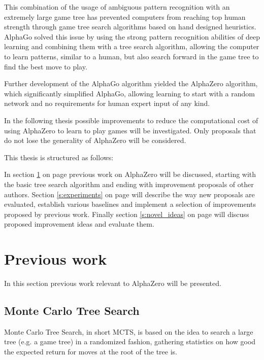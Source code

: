 \documentclass[12pt,onecolumn,oneside,titlepage]{article}
\begin{document}
This combination of the usage of ambiguous pattern recognition with an extremely large game tree has prevented computers from reaching top human strength through game tree search algorithms based on hand designed heuristics.
AlphaGo solved this issue by using the strong pattern recognition abilities of deep learning and combining them with a tree search algorithm, allowing the computer to learn patterns, similar to a human, but also search forward in the game tree to find the best move to play.

Further development of the AlphaGo algorithm yielded the AlphaZero algorithm, which significantly simplified AlphaGo, allowing learning to start with a random network and no requirements for human expert input of any kind.

In the following thesis possible improvements to reduce the computational cost of using AlphaZero to learn to play games will be investigated. Only proposals that do not lose the generality of AlphaZero will be considered.

This thesis is structured as follows:

In section \ref{sec:prev_work} on page \pageref{sec:prev_work} previous work on AlphaZero will be discussed, starting with the basic tree search algorithm and ending with improvement proposals of other authors.
Section \ref{s:experiments} on page \pageref{s:experiments} will describe the way new proposals are evaluated, establish various baselines and implement a selection of improvements proposed by previous work.
Finally section \ref{s:novel_ideas} on page \pageref{s:novel_ideas} will discuss proposed improvement ideas and evaluate them.

\section{Previous work} \label{sec:prev_work}

In this section previous work relevant to AlphaZero will be presented.

\subsection{Monte Carlo Tree Search}
\label{s:mcts}

Monte Carlo Tree Search, in short MCTS, is based on the idea to search a large tree (e.g. a game tree) in a randomized fashion, gathering statistics on how good the expected return for moves at the root of the tree is.
\end{document}
